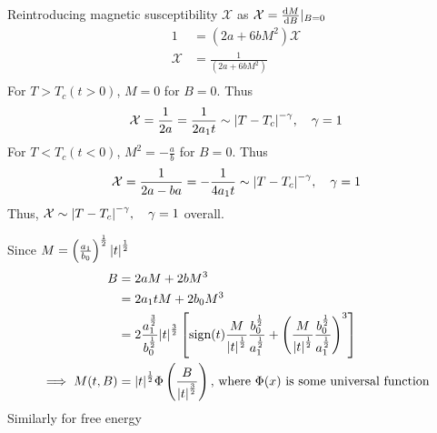 \documentclass[12pt,a4paper,titlepage]{article}
\newcommand{\trm}[1]{\textrm{#1}} %
\newcommand{\Chi}{\mathcal{X}} %
\newcommand{\sign}{\trm{sign}}
\begin{document}
Reintroducing magnetic susceptibility $\Chi$ as $\Chi=\dv{M}{B}|_{B=0}$
\begin{equation}
\begin{aligned}
1&=(2a+6bM^{2})\Chi\\
\Chi&=\frac{1}{(2a+6bM^{2})}\\
\end{aligned}
\end{equation}
For $T>T_{c} (t>0)$, $M=0$ for $B=0$. Thus
\begin{equation}
\Chi=\frac{1}{2a}=\frac{1}{2a_{1}t}\sim\abs{T-T_{c}}^{-\gamma},\quad\gamma=1
\end{equation}
For $T<T_{c} (t<0)$, $M^{2}=-\frac{a}{b}$ for $B=0$. Thus
\begin{equation}
\Chi=\frac{1}{2a-ba}=-\frac{1}{4a_{1}t}\sim\abs{T-T_{c}}^{-\gamma},\quad\gamma=1
\end{equation}
Thus, $\Chi\sim\abs{T-T_{c}}^{-\gamma},\quad\gamma=1$ overall.
\begin{center}
\end{center}
Since $M=\left(\frac{a_{1}}{b_{0}}\right)^{\frac{1}{2}}\abs{t}^{\frac{1}{2}}$
\begin{equation}
\begin{aligned}
B&=2aM+2bM^{3}\\
&=2a_{1}tM+2b_{0}M^{3}\\
&=2\frac{a_{1}^{\frac{3}{2}}}{b_{0}^{\frac{1}{2}}}\abs{t}^{\frac{3}{2}}\left[\sign(t)\frac{M}{\abs{t}^{\frac{1}{2}}}\frac{b_{0}^{\frac{1}{2}}}{a_{1}^{\frac{1}{2}}}+\left(\frac{M}{\abs{t}^{\frac{1}{2}}}\frac{b_{0}^{\frac{1}{2}}}{a_{1}^{\frac{1}{2}}}\right)^{3}\right]\\
\implies M(t,B)&=\abs{t}^{\frac{1}{2}}\Phi\left(\frac{B}{\abs{t}^{\frac{3}{2}}}\right)\trm{, where $\Phi(x)$ is some universal function}
\end{aligned}
\end{equation}
Similarly for free energy
\end{document}
